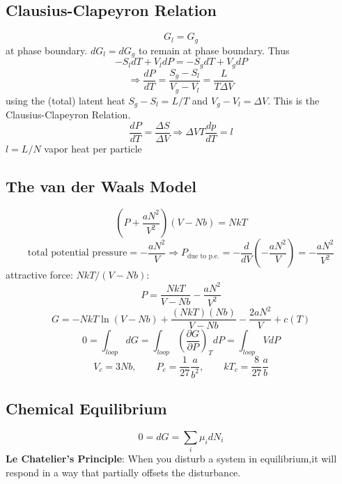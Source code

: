 \documentclass[a4paper,norsk, 10pt]{article}
\newcommand{\pd}[3]{\left(\frac{\partial #1}{\partial #2}\right)_{#3}}
\begin{document}
\subsection{Clausius-Clapeyron Relation}
\begin{equation}
G_l = G_g
\end{equation}
at phase boundary. $dG_l = dG_g$ to remain at phase boundary. Thus
\begin{equation}
-S_ldT + V_ldP = -S_gdT + V_gdP
\end{equation}
\begin{equation}
\Rightarrow \frac{dP}{dT} = \frac{S_g - S_l}{V_g - V_l} = \frac{L}{T\Delta V}
\end{equation}
using the (total) latent heat $S_g - S_l = L/T$ and $V_g - V_l = \Delta V$. This is the Clausius-Clapeyron Relation.
\begin{equation}
\frac{dP}{dT} = \frac{\Delta S}{\Delta V} \Rightarrow \Delta V T \frac{dp}{dT} = l
\end{equation}
$l = L/N$ vapor heat per particle	

\subsection{The van der Waals Model}
\begin{equation}
\left( P + \frac{aN^2}{V^2}\right)(V-Nb) = NkT
\end{equation}
\begin{equation}
\text{total potential pressure} = -\frac{aN^2}{V} \Rightarrow P_{\text{due to p.e.}} = -\frac{d}{dV}\left(-\frac{aN^2}{V}\right) = -\frac{aN^2}{V^2}
\end{equation}
attractive force: $NkT/(V-Nb)$:
\begin{equation}
P = \frac{NkT}{V - Nb} -\frac{aN^2}{V^2}
\end{equation}
\begin{equation}
G = -NkT\ln(V-Nb) + \frac{(NkT)(Nb)}{V-Nb}- \frac{2aN^2}{V} + c(T)
\end{equation}
\begin{equation}
0 = \int_{loop} dG = \int_{loop}\pd{G}{P}{T} dP = \int_{loop} V dP 
\end{equation}
\begin{equation}
V_c = 3Nb,\qquad P_c = \frac{1}{27}\frac{a}{b^2}, \qquad kT_c = \frac{8}{27}\frac{a}{b}
\end{equation}
\subsection{Chemical Equilibrium}
\begin{equation}
0 = dG = \sum_i \mu_i dN_i
\end{equation}
\textbf{Le Chatelier's Principle}: When you disturb a system in equilibrium,it will respond in a way that partially offsets the disturbance.
\end{document}
